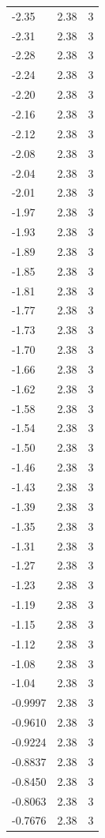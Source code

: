 \begin{longtable}{lrr}
  -2.35 & 2.38 & 3 \\
  -2.31 & 2.38 & 3 \\
  -2.28 & 2.38 & 3 \\
  -2.24 & 2.38 & 3 \\
  -2.20 & 2.38 & 3 \\
  -2.16 & 2.38 & 3 \\
  -2.12 & 2.38 & 3 \\
  -2.08 & 2.38 & 3 \\
  -2.04 & 2.38 & 3 \\
  -2.01 & 2.38 & 3 \\
  -1.97 & 2.38 & 3 \\
  -1.93 & 2.38 & 3 \\
  -1.89 & 2.38 & 3 \\
  -1.85 & 2.38 & 3 \\
  -1.81 & 2.38 & 3 \\
  -1.77 & 2.38 & 3 \\
  -1.73 & 2.38 & 3 \\
  -1.70 & 2.38 & 3 \\
  -1.66 & 2.38 & 3 \\
  -1.62 & 2.38 & 3 \\
  -1.58 & 2.38 & 3 \\
  -1.54 & 2.38 & 3 \\
  -1.50 & 2.38 & 3 \\
  -1.46 & 2.38 & 3 \\
  -1.43 & 2.38 & 3 \\
  -1.39 & 2.38 & 3 \\
  -1.35 & 2.38 & 3 \\
  -1.31 & 2.38 & 3 \\
  -1.27 & 2.38 & 3 \\
  -1.23 & 2.38 & 3 \\
  -1.19 & 2.38 & 3 \\
  -1.15 & 2.38 & 3 \\
  -1.12 & 2.38 & 3 \\
  -1.08 & 2.38 & 3 \\
  -1.04 & 2.38 & 3 \\
  -0.9997 & 2.38 & 3 \\
  -0.9610 & 2.38 & 3 \\
  -0.9224 & 2.38 & 3 \\
  -0.8837 & 2.38 & 3 \\
  -0.8450 & 2.38 & 3 \\
  -0.8063 & 2.38 & 3 \\
  -0.7676 & 2.38 & 3 \\

\end{longtable}
